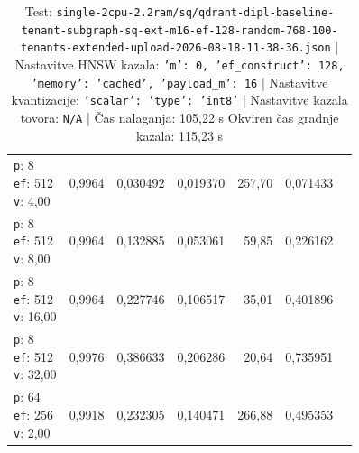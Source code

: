 \begin{table}[htbp]
\begin{tabularx}{\textwidth}{Xrrrrrr}
    \makecell{\texttt{p}: 8\\\texttt{ef}: 512\\\texttt{v}: 4,00} & 0,9964 & 0,030492 & 0,019370 & 257,70 & 0,071433 \\
    \makecell{\texttt{p}: 8\\\texttt{ef}: 512\\\texttt{v}: 8,00} & 0,9964 & 0,132885 & 0,053061 & 59,85 & 0,226162 \\
    \makecell{\texttt{p}: 8\\\texttt{ef}: 512\\\texttt{v}: 16,00} & 0,9964 & 0,227746 & 0,106517 & 35,01 & 0,401896 \\
    \makecell{\texttt{p}: 8\\\texttt{ef}: 512\\\texttt{v}: 32,00} & 0,9976 & 0,386633 & 0,206286 & 20,64 & 0,735951 \\
    \makecell{\texttt{p}: 64\\\texttt{ef}: 256\\\texttt{v}: 2,00} & 0,9918 & 0,232305 & 0,140471 & 266,88 & 0,495353 \\
    \bottomrule
  \end{tabularx}
\caption* {Test: \texttt{single-2cpu-2.2ram/sq/qdrant-dipl-baseline-tenant-subgraph-sq-ext-m16-ef-128-random-768-100-tenants-extended-upload-2026-08-18-11-38-36.json} | Nastavitve HNSW kazala: \texttt{{'m': 0, 'ef\_construct': 128, 'memory': 'cached', 'payload\_m': 16}} | Nastavitve kvantizacije: \texttt{{'scalar': {'type': 'int8'}}} | Nastavitve kazala tovora: \texttt{N/A} | Čas nalaganja: 105,22 s Okviren čas gradnje kazala: 115,23 s}\end{table}


